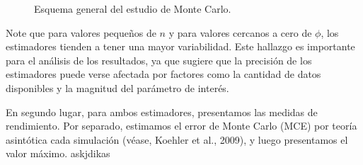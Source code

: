 \begin{figure}[h]
\begin{minipage}{0.45\textwidth}
    \caption{Esquema general del estudio de Monte Carlo.}
    \label{fig:monte_carlo_res2}
    \end{minipage}
\end{figure}

Note que para valores pequeños de $n$ y para valores cercanos a cero de $\phi$, 
los estimadores tienden a tener una mayor variabilidad.
Este hallazgo es importante para el análisis de los resultados, 
ya que sugiere que la precisión de los estimadores puede verse afectada por factores como la cantidad de datos 
disponibles y la magnitud del parámetro de interés.


En segundo lugar, para ambos estimadores, presentamos las medidas de rendimiento. Por separado, estimamos el error de Monte Carlo (MCE) por teoría asintótica cada simulación (véase, Koehler et al., 2009), y luego presentamos el valor máximo.
 askjdikas


 
